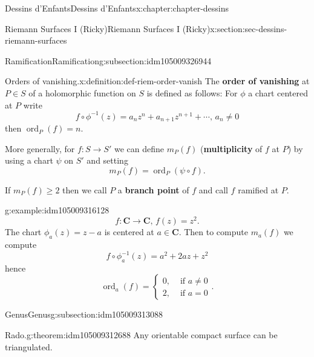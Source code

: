 \documentclass[oneside,10pt,]{book}
\newcommand{\terminology}[1]{\textbf{#1}}
\numberwithin{equation}{section}
\newcommand{\inv}{^{-1}}
\newcommand{\CC}{\mathbf{C}}
\DeclareMathOperator{\ord}{ord}
\newcommand{\amp}{&}
\begin{document}
\begin{chapterptx}{Dessins d'Enfants}{}{Dessins d'Enfants}{}{}{x:chapter:chapter-dessins}
\begin{sectionptx}{Riemann Surfaces I (Ricky)}{}{Riemann Surfaces I (Ricky)}{}{}{x:section:sec-dessins-riemann-surfaces}
\typeout{************************************************}
%
\begin{subsectionptx}{Ramification}{}{Ramification}{}{}{g:subsection:idm105009326944}
\begin{definition}{Orders of vanishing.}{x:definition:def-riem-order-vanish}%
The \terminology{order of vanishing} at \(P\in S\) of a holomorphic function on \(S\) is defined as follows: For \(\phi\) a  chart centered at \(P\) write%
\begin{equation*}
f\circ \phi\inv (z) = a_n z^n + a_{n+1}z^{n+1} + \cdots,\,a_n\ne 0
\end{equation*}
then \(\ord_P(f) = n\).%
\par
More generally, for \(f\colon S \to S'\) we can define \(m_P(f)\) (\terminology{multiplicity} of \(f\) at \(P\)) by using a chart \(\psi\) on \(S'\) and setting%
\begin{equation*}
m_P(f) = \ord_P(\psi\circ f)\text{.}
\end{equation*}
%
\par
If \(m_P(f)\ge 2\) then we call \(P\) a \terminology{branch point} of \(f\) and call \(f\) ramified at \(P\).%
\end{definition}
\begin{example}{}{g:example:idm105009316128}%
%
\begin{equation*}
f\colon \CC \to \CC,\,f(z) = z^2\text{.}
\end{equation*}
The chart \(\phi_a(z) = z-a\) is centered at \(a \in \CC\). Then to compute \(m_a(f)\) we compute%
\begin{equation*}
f\circ \phi\inv_a(z) = a^2 + 2az + z^2
\end{equation*}
hence%
\begin{equation*}
\ord_a(f) =\begin{cases} 0,\amp \text{ if } a\ne 0\\ 2,\amp\text{ if } a= 0\end{cases}\text{.}
\end{equation*}
%
\end{example}
\end{subsectionptx}
%
%
\typeout{************************************************}
\typeout{************************************************}
%
\begin{subsectionptx}{Genus}{}{Genus}{}{}{g:subsection:idm105009313088}
\begin{theorem}{Rado.}{}{g:theorem:idm105009312688}%
Any orientable compact surface can be triangulated.%

\end{theorem}
\end{subsectionptx}
\end{sectionptx}
\end{chapterptx}
\end{document}
